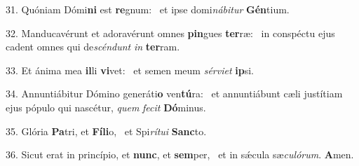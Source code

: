 31. Quóniam Dómi\textbf{ni} est \textbf{re}gnum: \ast\  et ipse domi\textit{ná}\textit{bi}\textit{tur} \textbf{Gén}tium.\

32. Manducavérunt et adoravérunt omnes \textbf{pin}gues \textbf{ter}ræ: \ast\  in conspéctu ejus cadent omnes qui de\textit{scén}\textit{dunt} \textit{in} \textbf{ter}ram.\

33. Et ánima mea \textbf{il}li \textbf{vi}vet: \ast\  et semen meum \textit{sér}\textit{vi}\textit{et} \textbf{ip}si.\

34. Annuntiábitur Dómino generáti\textbf{o} ven\textbf{tú}ra: \ast\  et annuntiábunt cæli justítiam ejus pópulo qui nascétur, \textit{quem} \textit{fe}\textit{cit} \textbf{Dó}minus.\

35. Glória \textbf{Pa}tri, et \textbf{Fí}\textbf{li}o, \ast\  et Spi\textit{rí}\textit{tu}\textit{i} \textbf{Sanc}to.\

36. Sicut erat in princípio, et \textbf{nunc}, et \textbf{sem}per, \ast\  et in sǽcula sæ\textit{cu}\textit{ló}\textit{rum}. \textbf{A}men.\

